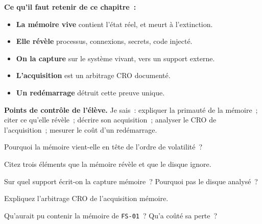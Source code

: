 \separateur

\begin{boxresume}
\textbf{Ce qu'il faut retenir de ce chapitre~:}
\begin{itemize}
    \item \textbf{La mémoire vive} contient l'état réel, et meurt à
          l'extinction.
    \item \textbf{Elle révèle} processus, connexions, secrets, code injecté.
    \item \textbf{On la capture} sur le système vivant, vers un support
          externe.
    \item \textbf{L'acquisition} est un arbitrage CRO documenté.
    \item \textbf{Un redémarrage} détruit cette preuve unique.
\end{itemize}
\end{boxresume}

\begin{boxinfo}
\textbf{Points de contrôle de l'élève.} Je sais~: expliquer la primauté de la
mémoire~; citer ce qu'elle révèle~; décrire son acquisition~; analyser le CRO
de l'acquisition~; mesurer le coût d'un redémarrage.
\end{boxinfo}

\bigskip

\begin{boxexo}[title={\ding{45}\quad Exercice~13.1. Pourquoi d'abord \niveaubase}]
Pourquoi la mémoire vient-elle en tête de l'ordre de volatilité~?
\end{boxexo}

\begin{boxexo}[title={\ding{45}\quad Exercice~13.2. Révélations \niveaubase}]
Citez trois éléments que la mémoire révèle et que le disque ignore.
\end{boxexo}

\begin{boxexo}[title={\ding{45}\quad Exercice~13.3. Support \niveaubase}]
Sur quel support écrit-on la capture mémoire~? Pourquoi pas le disque
analysé~?
\end{boxexo}

\begin{boxexo}[title={\ding{45}\quad Exercice~13.4. CRO \niveaumoyen}]
Expliquez l'arbitrage CRO de l'acquisition mémoire.
\end{boxexo}

\begin{boxexo}[title={\ding{45}\quad Exercice~13.5. FARO \niveaumoyen}]
Qu'aurait pu contenir la mémoire de \texttt{FS-01}~? Qu'a coûté sa perte~?
\end{boxexo}

